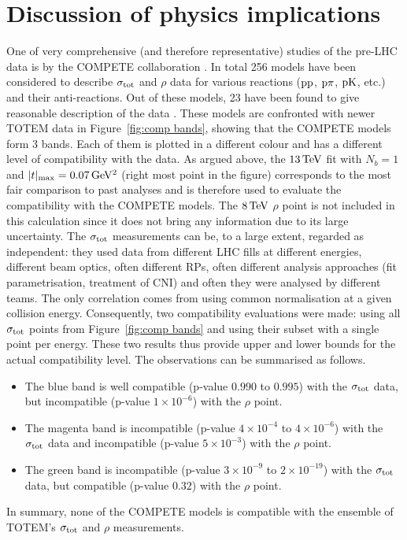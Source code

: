 \section{Discussion of physics implications}
\label{sec:discussion}

One of very comprehensive (and therefore representative) studies of the pre-LHC data is by the COMPETE collaboration \cite{compete}. In total 256 models have been considered to describe $\sigma_{\rm tot}$ and $\rho$ data for various reactions ($\rm pp$, $\rm p\pi$, $\rm pK$, etc.) and their anti-reactions. Out of these models, 23 have been found to give reasonable description of the data \cite{compete-details}. These models are confronted with newer TOTEM data in Figure~\ref{fig:comp bands}, showing that the COMPETE models form 3 bands. Each of them is plotted in a different colour and has a different level of compatibility with the data. As argued above, the $13\,{\rm TeV}$ fit with $N_b=1$ and $|t|_{\rm max} = 0.07\,{\rm GeV^2}$ (right most point in the figure) corresponds to the most fair comparison to past analyses and is therefore used to evaluate the compatibility with the COMPETE models. The $8\,{\rm TeV}$ $\rho$ point is not included in this calculation since it does not bring any information due to its large uncertainty. The $\sigma_{\rm tot}$ measurements can be, to a large extent, regarded as independent: they used data from different LHC fills at different energies, different beam optics, often different RPs, often different analysis approaches (fit parametrisation, treatment of CNI) and often they were analysed by different teams. The only correlation comes from using common normalisation at a given collision energy. Consequently, two compatibility evaluations were made: using all $\sigma_{\rm tot}$ points from Figure~\ref{fig:comp bands} and using their subset with a single point per energy. These two results thus provide upper and lower bounds for the actual compatibility level. The observations can be summarised as follows.
\begin{itemize}[noitemsep,topsep=0pt]
\item The blue band is well compatible (p-value $0.990$ to $0.995$) with the $\sigma_{\rm tot}$ data, but incompatible (p-value $1\times10^{-6}$) with the $\rho$ point.
\item The magenta band is incompatible (p-value $4\times10^{-4}$ to $4\times10^{-6}$) with the $\sigma_{\rm tot}$ data and incompatible (p-value $5\times10^{-3}$) with the $\rho$ point.
\item The green band is incompatible (p-value $3\times10^{-9}$ to $2\times10^{-19}$) with the $\sigma_{\rm tot}$ data, but compatible (p-value $0.32$) with the $\rho$ point.
\end{itemize}
In summary, none of the COMPETE models is compatible with the ensemble of TOTEM's $\sigma_{\rm tot}$ and $\rho$ measurements.

